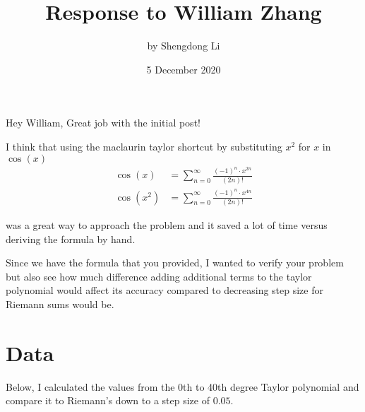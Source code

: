 \documentclass[12pt]{article}
\begin{document}
\title{Response to William Zhang}
\author{by Shengdong Li}
\date{5 December 2020}
\maketitle

Hey William,
Great job with the initial post!

I think that using the maclaurin taylor shortcut by substituting $x^2$ for $x$ in $\cos(x)$
\begin{align*}
  \cos\left(x\right)     & =\sum_{n=0}^{\infty}\frac{\left(-1\right)^{n}\cdot x^{2n}}{\left(2n\right)!} \\
  \cos\left(x^{2}\right) & =\sum_{n=0}^{\infty}\frac{\left(-1\right)^{n}\cdot x^{4n}}{\left(2n\right)!}
\end{align*}

was a great way to approach the problem and it saved a lot of time versus deriving the formula by hand. 

Since we have the formula that you provided, I wanted to verify your problem but also see how much difference adding additional terms to the taylor polynomial would affect its accuracy compared to decreasing step size for Riemann sums would be. 

\section{Data}

Below, I calculated the values from the 0th to 40th degree Taylor polynomial and compare it to Riemann's down to a step size of $0.05$.
\end{document}
